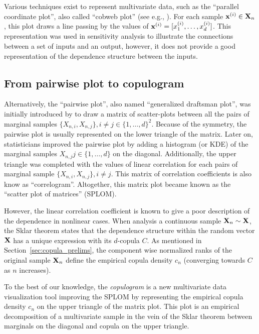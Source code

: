 Various techniques exist to represent multivariate data, such as the ``parallel coordinate plot'', also called ``cobweb plot'' (see e.g., \citep{heinrich_2013_cobweb}). 
For each sample ${\bf x}^{(i)} \in {\bf X}_n$, this plot draws a line passing by the values of ${\bf x}^{(i)} = [x_1^{(i)}, \dots, x_d^{(i)}]$. 
This representation was used in sensitivity analysis to illustrate the connections between a set of inputs and an output, however, it does not provide a good representation of the dependence structure between the inputs. 

\subsection{From pairwise plot to copulogram}
Alternatively, the ``pairwise plot'', also named ``generalized draftsman plot'', was initially introduced by \citet{hartigan_1975_splom} to draw a matrix of scatter-plots between all the pairs of marginal samples $\{X_{n, i}, X_{n, j}\}, i \ne j \in \{1, \dots, d\}^2$. 
Because of the symmetry, the pairwise plot is usually represented on the lower triangle of the matrix. 
Later on, statisticians improved the pairwise plot by adding a histogram (or KDE) of the marginal samples $X_{n, j} j \in \{1, \dots, d\}$ on the diagonal. 
Additionally, the upper triangle was completed with the values of linear correlation for each pairs of marginal sample $\{X_{n, i}, X_{n, j}\}, i \ne j$. 
This matrix of correlation coefficients is also know as ``correlogram''. 
Altogether, this matrix plot became known as the ``scatter plot of matrices'' (SPLOM). 

However, the linear correlation coefficient is known to give a poor description of the dependence in nonlinear cases. 
When analysis a continuous sample ${\bf X}_n \sim {\bf X}$, the Sklar theorem states that the dependence structure within the random vector ${\bf X}$ has a unique expression with its $d$-copula $C$. 
As mentioned in Section~\ref{sec:copula_prelims}, the component wise normalized ranks of the original sample ${\bf X}_n$ define the empirical copula density $c_n$ (converging towards $C$ as $n$ increases).

To the best of our knowledge, the \textit{copulogram} is a new multivariate data visualization tool improving the SPLOM by representing the empirical copula density $c_n$ on the upper triangle of the matrix plot. 
This plot is an empirical decomposition of a multivariate sample in the vein of the Sklar theorem between marginals on the diagonal and copula on the upper triangle.

